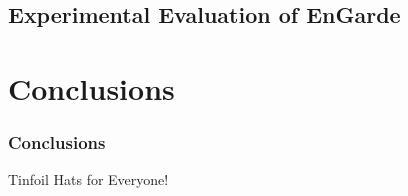 \documentclass[unknownkeysallowed]{beamer}
\begin{document}
\subsection{Experimental Evaluation of EnGarde}
\section{Conclusions}
\begin{frame}
  \frametitle{Conclusions}
  \begin{block}{Tinfoil Hats for Everyone!}
  \end{block}
\end{frame}



%
%
%
%
%
\end{document}
